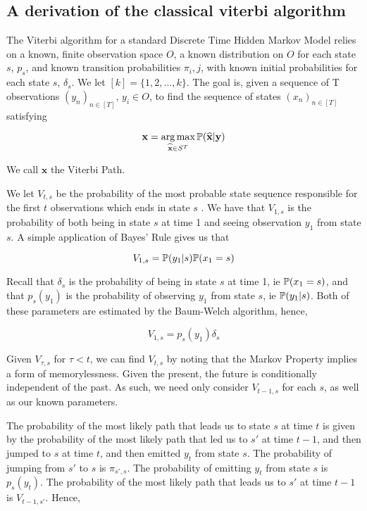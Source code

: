 \subsection{A derivation of the classical viterbi algorithm}

The Viterbi algorithm for a standard Discrete Time Hidden Markov Model relies on a known, finite observation space $O$, a known distribution on $O$ for each state $s$, $p_s$, and known transition probabilities $\pi_i,j$, with known initial probabilities for each state $s$, $\delta_s$. We let $[k] = \{1,2,...,k\}$. The goal is, given a sequence of T observations $(y_n)_{n \in [T]}$, $y_i \in O$, to find the sequence of states $(x_n)_{n \in [T]}$ satisfying

$$
\mathbf{x} = \operatorname*{arg\,max}_{\widehat{\mathbf{x}} \in S^T} \mathbb{P}(\mathbf{\widehat{x}} | \mathbf{y})
$$

We call $\mathbf{x}$ the Viterbi Path.

We let $V_{t,s}$ be the probability of the most probable state sequence responsible for the first $t$ observations which ends in state $s$ %
. We have that $V_{1,s}$ is the probability of both being in state $s$ at time 1 and seeing observation $y_1$ from state $s$. A simple application of Bayes' Rule gives us that

$$
V_{1,s} = \mathbb{P} (y_1|s)\mathbb{P}(x_1=s)
$$

Recall that $\delta_s$ is the probability of being in state $s$ at time 1, ie $\mathbb{P}(x_1=s)$, and that $p_s(y_1)$ is the probability of observing $y_1$ from state $s$, ie $\mathbb{P} (y_1|s)$. Both of these parameters are estimated by the Baum-Welch algorithm, hence,

$$
V_{1,s} = p_s(y_1)\delta_s
$$

Given $V_{\tau,s}$ for $\tau < t$, we can find $V_{t,s}$ by noting that the Markov Property implies a form of memorylessness. Given the present, the future is conditionally independent of the past. As such, we need only consider $V_{t-1,s}$ for each $s$, as well as our known parameters. 

The probability of the most likely path that leads us to state $s$ at time $t$ is given by the probability of the most likely path that led us to $s'$ at time $t-1$, and then jumped to $s$ at time $t$, and then emitted $y_t$ from state $s$. The probability of jumping from $s'$ to $s$ is $\pi_{s',s}$. The probability of emitting $y_t$ from state $s$ is $p_s(y_t)$. The probability of the most likely path that leads us to $s'$ at time $t-1$ is $V_{t-1,s'}$. Hence,

